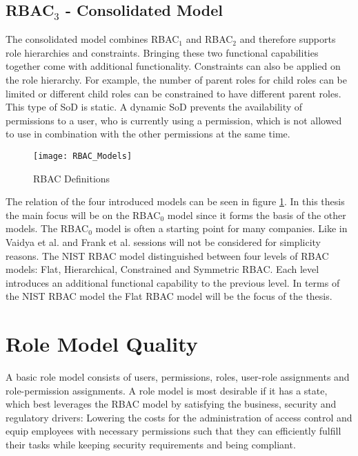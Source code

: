         \subsection{RBAC$_3$ - Consolidated Model}
            The consolidated model combines RBAC$_1$ and RBAC$_2$ and therefore supports role hierarchies and constraints. Bringing these two functional capabilities together come with additional functionality. Constraints can also be applied on the role hierarchy. For example, the number of parent roles for child roles can be limited or different child roles can be constrained to have different parent roles. This type of SoD is static. A dynamic SoD prevents the availability of permissions to a user, who is currently using a permission, which is not allowed to use in combination with the other permissions at the same time.            
    \begin{figure}[H]
        \centering
        \texttt{[image: RBAC\_Models]}
        \caption{RBAC Definitions\cite{tassey2002economic}}
        \label{fig:rbacmodels}
    \end{figure}
    
    The relation of the four introduced models can be seen in figure \ref{fig:rbacmodels}. In this thesis the main focus will be on the RBAC$_0$ model since it forms the basis of the other models. The RBAC$_0$ model is often a starting point for many companies.
    Like in Vaidya et al.\cite{Vaidya:2007} and Frank et al.\cite{Frank:2013} sessions will not be considered for simplicity reasons.
    The NIST RBAC model \cite{sandhu2000nist} distinguished between four levels of RBAC models: Flat, Hierarchical, Constrained and Symmetric RBAC. Each level introduces an additional functional capability to the previous level. In terms of the NIST RBAC model the Flat RBAC model will be the focus of the thesis.
    
    \section{Role Model Quality}
    \label{sec:rmQuality}
    A basic role model consists of users, permissions, roles, user-role assignments and role-permission assignments. A role model is most desirable if it has a state, which best leverages the RBAC model by satisfying the business, security and regulatory drivers: Lowering the costs for the administration of access control and equip employees with necessary permissions such that they can efficiently fulfill their tasks while keeping security requirements and being compliant.
    
